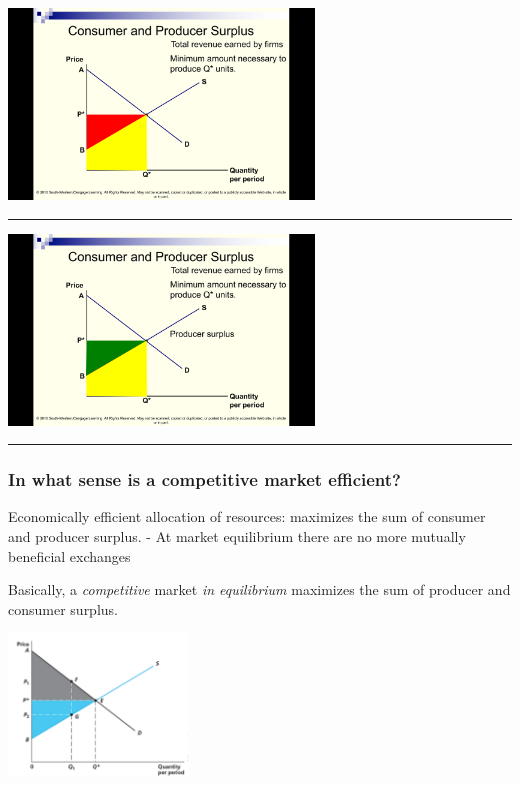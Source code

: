 \documentclass[]{article}
\begin{document}
\includegraphics[height=2in]{picsfigs/prodsurp2.png}

\begin{center}\rule{0.5\linewidth}{\linethickness}\end{center}

\includegraphics[height=2in]{picsfigs/prodsurp3.png}

\begin{center}\rule{0.5\linewidth}{\linethickness}\end{center}

\hypertarget{in-what-sense-is-a-competitive-market-efficient}{%
\subsubsection{In what sense is a competitive market
efficient?}\label{in-what-sense-is-a-competitive-market-efficient}}

Economically efficient allocation of resources: maximizes the sum of
consumer and producer surplus. - At market equilibrium there are no more
mutually beneficial exchanges

\bigskip

Basically, a \emph{competitive} market \emph{in equilibrium} maximizes
the sum of producer and consumer surplus.

\includegraphics[height=1.5in]{picsfigs/consumerprodrsurplusmax.png}
\end{document}

